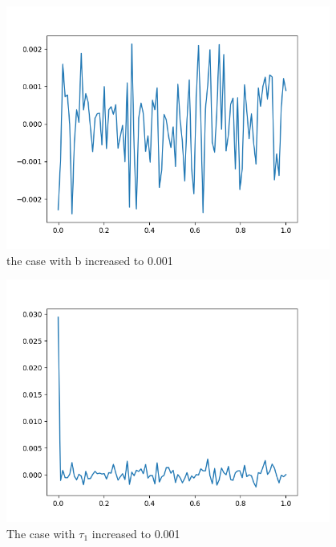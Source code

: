 \documentclass[10pt]{article}
\begin{document}
\begin{enumerate}[label=(\Alph*)]
        \begin{figure}[htb] \centering
        \includegraphics[width=0.95\textwidth]{./increased_b.png}
        \caption{the case with b increased to  0.001}
        \label{fig:increased_b}
        \end{figure}
        
        \begin{figure}[htb] \centering
        \includegraphics[width=0.95\textwidth]{./increased_tau1.png}
        \caption{The case with $\tau_1$ increased to 0.001}
        \label{fig:increased_tau1}
        \end{figure}
        

\end{enumerate}
\end{document}
